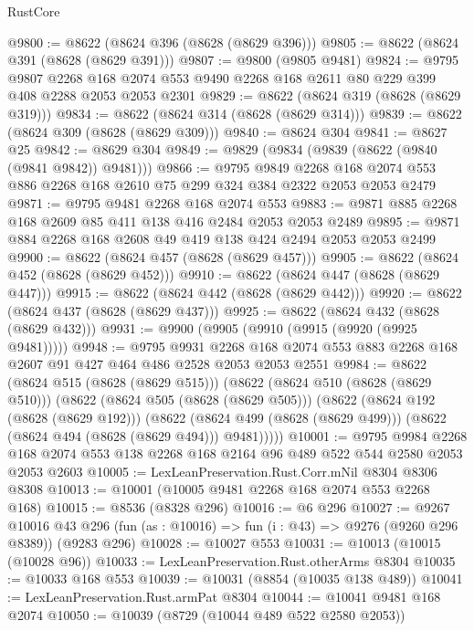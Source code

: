 \begin{lexlean}{RustCore}
\begin{coremodule}
@9800 := @8622 (@8624 @396 (@8628 (@8629 @396)))
@9805 := @8622 (@8624 @391 (@8628 (@8629 @391)))
@9807 := @9800 (@9805 @9481)
@9824 := @9795
    @9807
    @2268
    @168
    @2074
    @553
    @9490
    @2268
    @168
    @2611
    @80
    @229
    @399
    @408
    @2288
    @2053
    @2053
    @2301
@9829 := @8622 (@8624 @319 (@8628 (@8629 @319)))
@9834 := @8622 (@8624 @314 (@8628 (@8629 @314)))
@9839 := @8622 (@8624 @309 (@8628 (@8629 @309)))
@9840 := @8624 @304
@9841 := @8627 @25
@9842 := @8629 @304
@9849 := @9829 (@9834 (@9839 (@8622 (@9840 (@9841 @9842)) @9481)))
@9866 := @9795
    @9849
    @2268
    @168
    @2074
    @553
    @886
    @2268
    @168
    @2610
    @75
    @299
    @324
    @384
    @2322
    @2053
    @2053
    @2479
@9871 := @9795 @9481 @2268 @168 @2074 @553
@9883 := @9871 @885 @2268 @168 @2609 @85 @411 @138 @416 @2484 @2053 @2053 @2489
@9895 := @9871 @884 @2268 @168 @2608 @49 @419 @138 @424 @2494 @2053 @2053 @2499
@9900 := @8622 (@8624 @457 (@8628 (@8629 @457)))
@9905 := @8622 (@8624 @452 (@8628 (@8629 @452)))
@9910 := @8622 (@8624 @447 (@8628 (@8629 @447)))
@9915 := @8622 (@8624 @442 (@8628 (@8629 @442)))
@9920 := @8622 (@8624 @437 (@8628 (@8629 @437)))
@9925 := @8622 (@8624 @432 (@8628 (@8629 @432)))
@9931 := @9900 (@9905 (@9910 (@9915 (@9920 (@9925 @9481)))))
@9948 := @9795
    @9931
    @2268
    @168
    @2074
    @553
    @883
    @2268
    @168
    @2607
    @91
    @427
    @464
    @486
    @2528
    @2053
    @2053
    @2551
@9984 := @8622
    (@8624 @515 (@8628 (@8629 @515)))
    (@8622
      (@8624 @510 (@8628 (@8629 @510)))
      (@8622
        (@8624 @505 (@8628 (@8629 @505)))
        (@8622
          (@8624 @192 (@8628 (@8629 @192)))
          (@8622
            (@8624 @499 (@8628 (@8629 @499)))
            (@8622 (@8624 @494 (@8628 (@8629 @494))) @9481)))))
@10001 := @9795
    @9984
    @2268
    @168
    @2074
    @553
    @138
    @2268
    @168
    @2164
    @96
    @489
    @522
    @544
    @2580
    @2053
    @2053
    @2603
@10005 := LexLeanPreservation.Rust.Corr.mNil @8304 @8306 @8308
@10013 := @10001 (@10005 @9481 @2268 @168 @2074 @553 @2268 @168)
@10015 := @8536 (@8328 @296)
@10016 := @6 @296
@10027 := @9267
    @10016
    @43
    @296
    (fun (as : @10016) => fun (i : @43) => @9276 (@9260 @296 @8389))
    (@9283 @296)
@10028 := @10027 @553
@10031 := @10013 (@10015 (@10028 @96))
@10033 := LexLeanPreservation.Rust.otherArms @8304
@10035 := @10033 @168 @553
@10039 := @10031 (@8854 (@10035 @138 @489))
@10041 := LexLeanPreservation.Rust.armPat @8304
@10044 := @10041 @9481 @168 @2074
@10050 := @10039 (@8729 (@10044 @489 @522 @2580 @2053))

\end{coremodule}
\end{lexlean}
